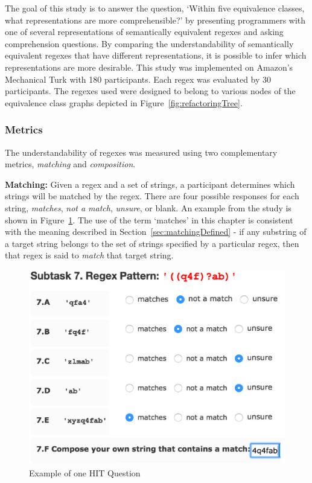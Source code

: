 
The goal of this study is to answer the question, `Within five equivalence classes, what representations are more comprehensible?' by presenting programmers with one of several representations of semantically equivalent regexes and asking comprehension questions. By comparing the understandability of semantically equivalent regexes that have different representations, it is possible to infer which representations are more desirable.
This study was implemented on Amazon's Mechanical Turk with 180 participants.  Each regex was evaluated by 30 participants.
The regexes used were designed to belong to various nodes of the equivalence class graphs depicted in Figure~\ref{fig:refactoringTree}.



\subsubsection{Metrics}
\label{sec:understandabilityMetrics}
The understandability of regexes was measured using two complementary metrics, \emph{matching} and \emph{composition}.

\textbf{Matching:}
Given a regex and a set of strings, a participant determines which strings will be matched by the regex. There are four possible responses for each string, \emph{matches}, \emph{not a match}, \emph{unsure}, or blank. An example from the study is shown in Figure~\ref{fig:exampleQuestion}.  The use of the term `matches' in this chapter is consistent with the meaning described in Section~\ref{sec:matchingDefined} - if any substring of a target string belongs to the set of strings specified by a particular regex, then that regex is said to \emph{match} that target string.


\begin{figure}[tb]
\centering
\includegraphics[width=0.54\columnwidth]{nontex/illustrations/exampleQuestion.eps}
\vspace{-12pt}
\caption{Example of one HIT Question}
\vspace{-6pt}
\label{fig:exampleQuestion}
\end{figure}

